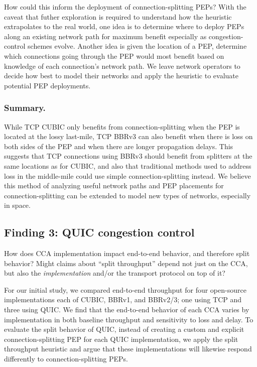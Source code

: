 How could this inform the deployment of connection-splitting PEPs?
With the caveat that futher exploration is required to understand how the
heuristic extrapolates to the real world, one idea is to
determine where to deploy PEPs along an existing network path for maximum
benefit especially as congestion-control schemes evolve.
Another idea is given the location of a PEP, determine which connections going
through the PEP would most benefit based on knowledge of each connection's
network path.
We leave network operators to decide how best to model their networks and apply
the heuristic to evaluate potential PEP deployments.

\subsubsection{Summary.}
While TCP CUBIC only benefits from connection-splitting when the PEP is located
at the lossy last-mile, TCP BBRv3 can also benefit when there is loss on both
sides of the PEP and when there are longer propagation delays. This suggests
that TCP connections using BBRv3 should benefit from splitters at the same
locations as for CUBIC, and also that traditional methods used to
address loss in the middle-mile could use simple connection-splitting instead.
We believe this method of analyzing useful network paths and PEP placements for
connection-splitting can be extended to model new types of networks, especially
in space.

\subsection{Finding 3: QUIC congestion control}
\label{sec:splitting:results:finding3}




How does CCA implementation impact end-to-end behavior, and therefore split
behavior? Might claims about ``split throughput'' depend not just on the CCA,
but also the \textit{implementation} and/or the transport protocol
on top of it?

For our initial study, we compared end-to-end throughput for four open-source
implementations each of CUBIC, BBRv1, and BBRv2/3; one using TCP and three
using QUIC. We find that the end-to-end behavior of each CCA varies by
implementation in both baseline throughput and sensitivity to loss and delay.
To evaluate the split behavior of QUIC, instead of creating a custom and
explicit connection-splitting PEP for each QUIC implementation, we apply the
split throughput heuristic and argue that these implementations
will likewise respond differently to connection-splitting PEPs.

